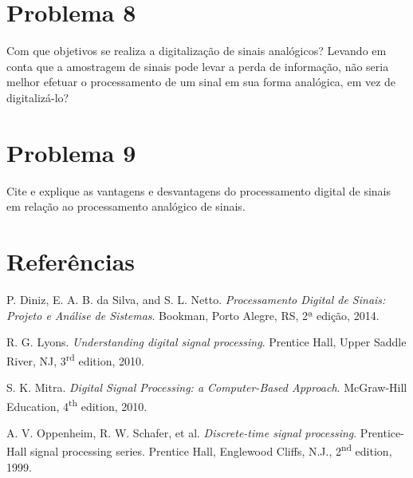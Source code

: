 \documentclass[12pt,a4paper]{article}
\begin{document}
\section{Problema 8}
Com que objetivos se realiza a digitalização de sinais analógicos? Levando em conta que a
amostragem de sinais pode levar a perda de informação, não seria melhor efetuar o processamento de
um sinal em sua forma analógica, em vez de digitalizá-lo?

\section{Problema 9}
Cite e explique as vantagens e desvantagens do processamento digital de sinais em relação ao
processamento analógico de sinais.

\section*{\sffamily\bfseries\color{unbblue} Referências}
\begin{enumerate}[label={[\arabic*]},leftmargin=2.5em,itemsep=0.6em]
  \item P. Diniz, E. A. B. da Silva, and S. L. Netto. \textit{Processamento Digital de Sinais:
        Projeto e Análise de Sistemas}. Bookman, Porto Alegre, RS, 2ª edição, 2014.
  \item R. G. Lyons. \textit{Understanding digital signal processing}. Prentice Hall, Upper Saddle
        River, NJ, 3\textsuperscript{rd} edition, 2010.
  \item S. K. Mitra. \textit{Digital Signal Processing: a Computer-Based Approach}. McGraw-Hill
        Education, 4\textsuperscript{th} edition, 2010.
  \item A. V. Oppenheim, R. W. Schafer, et al. \textit{Discrete-time signal processing}.
        Prentice-Hall signal processing series. Prentice Hall, Englewood Cliffs, N.J., 2\textsuperscript{nd}
        edition, 1999.
\end{enumerate}
\end{document}
